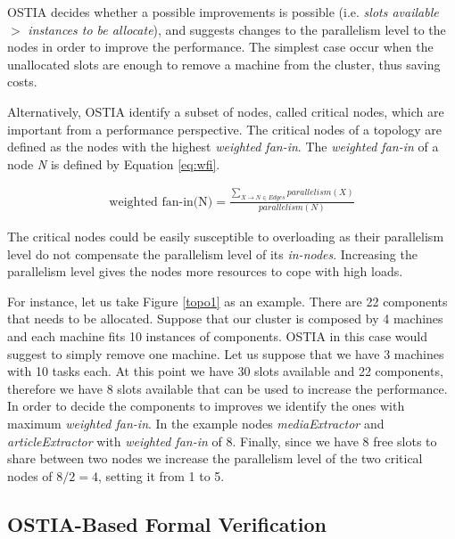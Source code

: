 OSTIA decides whether a possible improvements is possible (i.e. \emph{slots
  available} $>$ \emph{instances to be allocate}), and suggests changes to the
parallelism level to the nodes in order to improve the performance. The simplest
case occur when the unallocated slots are enough to remove a machine from the
cluster, thus saving costs.

Alternatively, OSTIA identify a subset of nodes, called critical nodes, which
are important from a performance perspective. The critical nodes of a topology
are defined as the nodes with the highest \emph{weighted fan-in}. The
\emph{weighted fan-in} of a node \emph{N} is defined by Equation \ref{eq:wfi}.

\begin{align}
  \text{weighted fan-in(N)} = \frac{\sum_{X \rightarrow N \in Edges} parallelism(X)}{parallelism(N)} \label{eq:wfi}
\end{align}

The critical nodes could be easily susceptible to overloading as their
parallelism level do not compensate the parallelism level of its
\emph{in-nodes}. Increasing the parallelism level gives the nodes more resources
to cope with high loads.

For instance, let us take Figure \ref{topo1} as an example. There are 22
components that needs to be allocated. Suppose that our cluster is composed by 4
machines and each machine fits 10 instances of components. OSTIA in this case
would suggest to simply remove one machine. Let us suppose that we have 3
machines with 10 tasks each. At this point we have 30 slots available and 22
components, therefore we have 8 slots available that can be used to increase the
performance. In order to decide the components to improves we identify the ones
with maximum \emph{weighted fan-in}. In the example nodes \emph{mediaExtractor}
and \emph{articleExtractor} with \emph{weighted fan-in} of 8. Finally, since we
have 8 free slots to share between two nodes we increase the parallelism level
of the two critical nodes of $8/2 = 4$, setting it from 1 to 5.



\subsection{OSTIA-Based Formal Verification}\label{ver}


